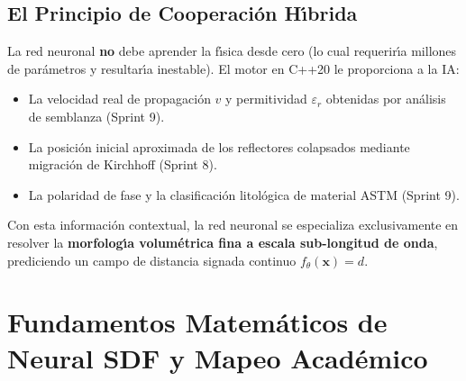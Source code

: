 \documentclass[11pt,a4paper]{article}
\begin{document}
\subsection{El Principio de Cooperaci{\'o}n H{\'\i}brida}
La red neuronal \textbf{no} debe aprender la f{\'\i}sica desde cero (lo cual requerir{\'\i}a millones de par{\'a}metros y resultar{\'\i}a inestable). El motor en C++20 le proporciona a la IA:
\begin{itemize}
    \item La velocidad real de propagaci{\'o}n $v$ y permitividad $\varepsilon_r$ obtenidas por an{\'a}lisis de semblanza (Sprint 9).
    \item La posici{\'o}n inicial aproximada de los reflectores colapsados mediante migraci{\'o}n de Kirchhoff (Sprint 8).
    \item La polaridad de fase y la clasificaci{\'o}n litol{\'o}gica de material ASTM (Sprint 9).
\end{itemize}
Con esta informaci{\'o}n contextual, la red neuronal se especializa exclusivamente en resolver la \textbf{morfolog{\'\i}a volum{\'e}trica fina a escala sub-longitud de onda}, prediciendo un campo de distancia signada continuo $f_\theta(\mathbf{x}) = d$.

\newpage

\section{Fundamentos Matem{\'a}ticos de Neural SDF y Mapeo Acad{\'e}mico}
\end{document}
